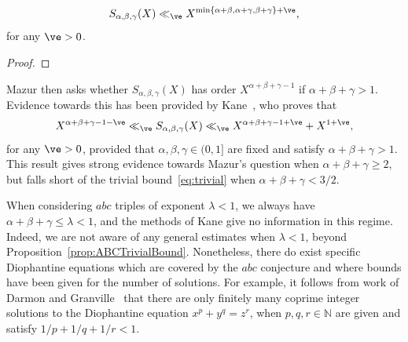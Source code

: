 \begin{lemma}\label{lem:TrivialBdforS}
\begin{equation}\label{eq:trivial}
 S_{\alpha,\beta,\gamma}(X)\ll_\ve X^{\min\{\alpha+\beta , \alpha+\gamma , \beta+\gamma\}+\ve},
\end{equation}
for any $\ve>0$.
\end{lemma}
\begin{proof}
\end{proof}


Mazur then asks whether
 $S_{\alpha,\beta,\gamma}(X)$ has order $X^{\alpha+\beta+\gamma-1}$
if $\alpha+\beta+\gamma>1$.
Evidence towards this has been provided by Kane~\cite[Theorems~1 and 2]{kane}, who proves that
\[
X^{\alpha+\beta+\gamma-1-\ve}\ll_\ve
S_{\alpha,\beta,\gamma}(X)\ll_\ve
X^{\alpha+\beta+\gamma-1+\ve}+X^{1+\ve},
\]
for any $\ve>0$,
provided that $\alpha,\beta,\gamma\in (0,1]$ are fixed and satisfy $\alpha+\beta+\gamma>1$.
This result gives strong evidence towards Mazur's question when
$\alpha+\beta+\gamma\geq 2$, but falls short of the trivial bound~\eqref{eq:trivial}
when $\alpha+\beta+\gamma<3/2$.


When considering $abc$ triples of exponent $\lambda<1$, we always have $\alpha+\beta+\gamma\leq \lambda< 1$, and the methods of Kane give no information
in this regime. Indeed, we are not aware of any general estimates when $\lambda<1$,
 beyond Proposition~\ref{prop:ABCTrivialBound}. Nonetheless, there do exist specific Diophantine equations which are covered by the $abc$ conjecture and where bounds have been given for the number of solutions.
For example, it follows from work of Darmon and
Granville~\cite{DG} that there are only finitely many coprime integer solutions to the Diophantine equation $x^p+y^q=z^r$, when $p,q,r\in \mathbb{N}$ are given and satisfy $1/p+1/q+1/r<1$.



